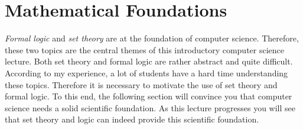 \chapter{Mathematical Foundations} 
\emph{Formal logic} and \emph{set theory} are at the foundation of computer science.
Therefore, these two topics are the central themes of this introductory computer science lecture. 
Both set theory and formal logic are rather abstract and quite difficult.  
According to my experience, a lot of students  have a  hard time understanding these
topics.  Therefore it is necessary to motivate the use of set theory and formal logic.
To this end, the following section will convince you that computer science needs a solid
scientific foundation.   As this lecture progresses you will see that set theory and logic
can indeed provide this scientific foundation.

